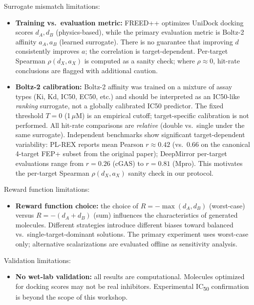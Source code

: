 Surrogate mismatch limitations:
\begin{itemize}
\item \textbf{Training vs.\ evaluation metric:} FREED++ optimizes UniDock docking
scores $d_A, d_B$ (physics-based), while the primary evaluation metric is Boltz-2
affinity $a_A, a_B$ (learned surrogate). There is no guarantee that improving $d$
consistently improves $a$; the correlation is target-dependent. Per-target Spearman
$\rho(d_X, a_X)$ is computed as a sanity check; where $\rho \approx 0$, hit-rate
conclusions are flagged with additional caution.
\item \textbf{Boltz-2 calibration:} Boltz-2 affinity was trained on a mixture of
assay types (Ki, Kd, IC50, EC50, etc.) and should be interpreted as an IC50-like
\emph{ranking} surrogate, not a globally calibrated IC50 predictor. The fixed
threshold $T=0$ (1\,$\mu$M) is an empirical cutoff; target-specific calibration is
not performed. All hit-rate comparisons are \emph{relative} (double vs.\ single
under the same surrogate). Independent benchmarks show significant target-dependent
variability: PL-REX reports mean Pearson $r \approx 0.42$ (vs.\ 0.66 on the
canonical 4-target FEP+ subset from the original paper); DeepMirror per-target
evaluations range from $r = 0.26$ (cGAS) to $r = 0.81$ (Mpro). This motivates
the per-target Spearman $\rho(d_X, a_X)$ sanity check in our protocol.
\end{itemize}

Reward function limitations:
\begin{itemize}
\item \textbf{Reward function choice:} the choice of $R = -\max(d_A, d_B)$ (worst-case)
versus $R = -(d_A + d_B)$ (sum) influences the characteristics
of generated molecules. Different strategies introduce different biases toward balanced
vs.\ single-target-dominant solutions. The primary experiment uses worst-case only;
alternative scalarizations are evaluated offline as sensitivity analysis.
\end{itemize}

Validation limitations:
\begin{itemize}
\item \textbf{No wet-lab validation:} all results are computational. Molecules optimized
for docking scores may not be real inhibitors. Experimental IC\textsubscript{50}
confirmation is beyond the scope of this workshop.
\end{itemize}

